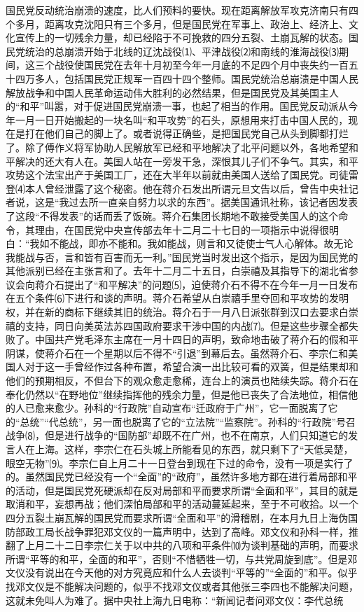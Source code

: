 \documentclass[UTF-8, a5paper, 12pt]{ctexart}
\begin{document}
国民党反动统治崩溃的速度，比人们预料的要快。现在距离解放军攻克济南只有四个多月，距离攻克沈阳只有三个多月，但是国民党在军事上、政治上、经济上、文化宣传上的一切残余力量，却已经陷于不可挽救的四分五裂、土崩瓦解的状态。国民党统治的总崩溃开始于北线的辽沈战役⑴、平津战役⑵和南线的淮海战役⑶期间，这三个战役使国民党在去年十月初至今年一月底的不足四个月中丧失约一百五十四万多人，包括国民党正规军一百四十四个整师。国民党统治总崩溃是中国人民解放战争和中国人民革命运动伟大胜利的必然结果，但是国民党及其美国主人的“和平”叫嚣，对于促进国民党崩溃一事，也起了相当的作用。国民党反动派从今年一月一日开始搬起的一块名叫“和平攻势”的石头，原想用来打击中国人民的，现在是打在他们自己的脚上了。或者说得正确些，是把国民党自己从头到脚都打烂了。除了傅作义将军协助人民解放军已经和平地解决了北平问题以外，各地希望和平解决的还大有人在。美国人站在一旁发干急，深恨其儿子们不争气。其实，和平攻势这个法宝出产于美国工厂，还在大半年以前就由美国人送给了国民党。司徒雷登⑷本人曾经泄露了这个秘密。他在蒋介石发出所谓元旦文告以后，曾告中央社记者说，这是“我过去所一直亲自努力以求的东西”。据美国通讯社称，该记者因发表了这段“不得发表”的话而丢了饭碗。蒋介石集团长期地不敢接受美国人的这个命令，其理由，在国民党中央宣传部去年十二月二十七日的一项指示中说得很明白：“我如不能战，即亦不能和。我如能战，则言和又徒使士气人心解体。故无论我能战与否，言和皆有百害而无一利。”国民党当时发出这个指示，是因为国民党的其他派别已经在主张言和了。去年十二月二十五日，白崇禧及其指导下的湖北省参议会向蒋介石提出了“和平解决”的问题⑸，迫使蒋介石不得不在今年一月一日发布在五个条件⑹下进行和谈的声明。蒋介石希望从白崇禧手里夺回和平攻势的发明权，并在新的商标下继续其旧的统治。蒋介石于一月八日派张群到汉口去要求白崇禧的支持，同日向美英法苏四国政府要求干涉中国的内战⑺。但是这些步骤全都失败了。中国共产党毛泽东主席在一月十四日的声明，致命地击破了蒋介石的假和平阴谋，使蒋介石在一个星期以后不得不“引退”到幕后去。虽然蒋介石、李宗仁和美国人对于这一手曾经作过各种布置，希望合演一出比较可看的双簧，但是结果却和他们的预期相反，不但台下的观众愈走愈稀，连台上的演员也陆续失踪。蒋介石在奉化仍然以“在野地位”继续指挥他的残余力量，但是他已丧失了合法地位，相信他的人已愈来愈少。孙科的“行政院”自动宣布“迁政府于广州”，它一面脱离了它的“总统”“代总统”，另一面也脱离了它的“立法院”“监察院”。孙科的“行政院”号召战争⑻，但是进行战争的“国防部”却既不在广州，也不在南京，人们只知道它的发言人在上海。这样，李宗仁在石头城上所能看见的东西，就只剩下了“天低吴楚，眼空无物”⑼。李宗仁自上月二十一日登台到现在下过的命令，没有一项是实行了的。虽然国民党已经没有一个“全面”的“政府”，虽然许多地方都在进行着局部和平的活动，但是国民党死硬派却在反对局部和平而要求所谓“全面和平”，其目的就是取消和平，妄想再战；他们深怕局部和平的活动蔓延起来，至于不可收拾。以一个四分五裂土崩瓦解的国民党而要求所谓“全面和平”的滑稽剧，在本月九日上海伪国防部政工局长战争罪犯邓文仪的一篇声明中，达到了高峰。邓文仪和孙科一样，推翻了上月二十二日李宗仁关于以中共的八项和平条件⑽为谈判基础的声明，而要求所谓“平等的和平，全面的和平”，否则“不惜牺牲一切，与共党周旋到底”。但是邓文仪没有说出在今天他的对方究竟应和什么人去谈判“平等的”“全面的”和平。似乎找邓文仪是不能解决问题的，似乎不找邓文仪或者其他张三李四也不能解决问题，这就未免叫人为难了。据中央社上海九日电称：“新闻记者问邓文仪：李代总统
\end{document}
